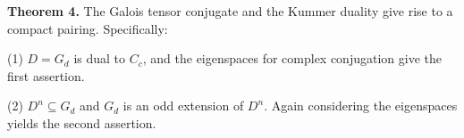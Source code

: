 \textbf{Theorem 4.} The Galois tensor conjugate and the Kummer duality give rise to a compact pairing. Specifically:

(1) $D = G_d$ is dual to $C_c$, and the eigenspaces for complex conjugation give the first assertion.

(2) $D^n \subseteq G_d$ and $G_d$ is an odd extension of $D^n$. Again considering the eigenspaces yields the second assertion.
